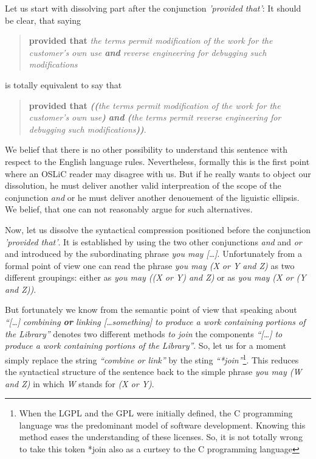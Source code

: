 Let us start with dissolving part after the conjunction \emph{'provided that'}:
It should be clear, that saying

\begin{quote}\noindent\textbf{provided that} \emph{the terms permit modification
of the work for the customer's own use \emph{\textbf{and}} reverse engineering
for debugging such modifications}\end{quote}

is totally equivalent to say that 

\begin{quote}\noindent[\ldots] \textbf{provided that} \emph{\textbf{((}the terms
permit modification of the work for the customer's own use\textbf{)}
\emph{\textbf{and}} \textbf{(}the terms permit reverse engineering for debugging
such modifications\textbf{))}}.
\end{quote}

We belief that there is no other possibility to understand this sentence with
respect to the English language rules. Nevertheless, formally this is the first
point where an OSLiC reader may disagree with us. But if he really wants to
object our dissolution, he must deliver another valid interpreation of the scope
of the conjunction \emph{and} or he must deliver another denouement of the
liguistic ellipsis. We belief, that one can not reasonably argue for such
alternatives.

Now, let us dissolve the syntactical compression positioned before the
conjunction \emph{'provided that'}. It is established by using the two other
conjunctions \emph{and} and \emph{or} and introduced by the subordinating phrase
\emph{you may [\ldots]}. Unfortunately from a formal point of view one can read
the phrase \emph{you may (X or Y and Z)} as two different groupings: either as
\emph{you may ((X or Y) and Z)} or as \emph{you may (X or (Y and Z))}. 

But fortunately we know from the semantic point of view that speaking about
\emph{\enquote{[\ldots] combining \textbf{or} linking [\ldots something] to
produce a work containing portions of the Library}} denotes two different
methods \emph{to join} the components \emph{\enquote{[\ldots] to produce a work
containing portions of the Library}}. So, let us for a moment simply replace the
string \emph{\enquote{combine or link}} by the sting
\emph{\enquote{*join}}\footnote{When the LGPL and the GPL were initially
defined, the C programming language was the predominant model of software
development. Knowing this method eases the understanding of these licenses. So,
it is not totally wrong to take this token *join also as a curtsey to the C
programming language}. This reduces the syntactical structure of the sentence
back to the simple phrase \emph{you may (W and Z)} in which \emph{W} stands
for \emph{(X or Y)}.

